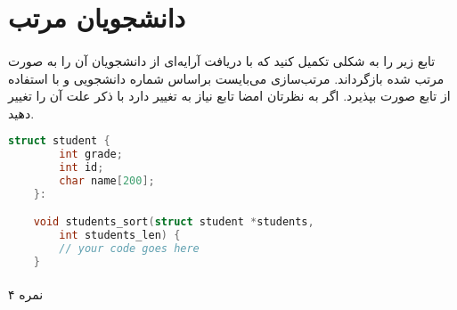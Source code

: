 \documentclass[../main.tex]{subfiles}
\begin{document}
\section{دانشجویان مرتب}
\paragraph{}
تابع زیر را به شکلی تکمیل کنید که با دریافت آرایه‌ای از دانشجویان
آن را به صورت مرتب شده بازگرداند.
مرتب‌سازی می‌بایست براساس شماره دانشجویی و با استفاده از تابع
صورت بپذیرد.
اگر به نظرتان امضا تابع نیاز به تغییر دارد با ذکر علت آن را تغییر دهید.

\begin{latin}
\begin{lstlisting}[language=c]
    struct student {
        int grade;
        int id;
        char name[200];
    }:

    void students_sort(struct student *students,
        int students_len) {
        // your code goes here
    }
\end{lstlisting}
\end{latin}

\paragraph{}
۴ نمره
\end{document}
